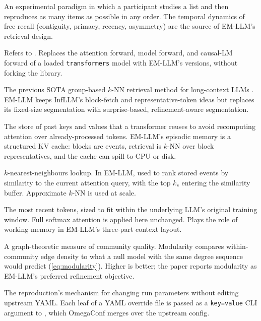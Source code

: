 \begin{description}[style=nextline,itemsep=0.4em]
  \item[Free recall]
  An experimental paradigm in which a participant studies a list and then reproduces as many items as possible in any order. The temporal dynamics of free recall (contiguity, primacy, recency, asymmetry) are the source of EM-LLM's retrieval design.

  \item[Hugging Face patch]
  Refers to . Replaces the attention forward, model forward, and causal-LM forward of a loaded \texttt{transformers} model with EM-LLM's versions, without forking the library.

  \item[InfLLM]
  The previous SOTA group-based $k$-NN retrieval method for long-context LLMs \cite{xiao2024infllm}. EM-LLM keeps InfLLM's block-fetch and representative-token ideas but replaces its fixed-size segmentation with surprise-based, refinement-aware segmentation.

  \item[KV cache]
  The store of past keys and values that a transformer reuses to avoid recomputing attention over already-processed tokens. EM-LLM's episodic memory is a structured KV cache: blocks are events, retrieval is $k$-NN over block representatives, and the cache can spill to CPU or disk.

  \item[$k$-NN retrieval]
  $k$-nearest-neighbours lookup. In EM-LLM, used to rank stored events by similarity to the current attention query, with the top $k_s$ entering the similarity buffer. Approximate $k$-NN is used at scale.

  \item[Local context]
  The most recent tokens, sized to fit within the underlying LLM's original training window. Full softmax attention is applied here unchanged. Plays the role of working memory in EM-LLM's three-part context layout.

  \item[Modularity]
  A graph-theoretic measure of community quality. Modularity compares within-community edge density to what a null model with the same degree sequence would predict (\cref{eq:modularity}). Higher is better; the paper reports modularity as EM-LLM's preferred refinement objective.

  \item[OmegaConf override]
  The reproduction's mechanism for changing run parameters without editing upstream YAML. Each leaf of a YAML override file is passed as a \texttt{key=value} CLI argument to , which OmegaConf merges over the upstream config.


\end{description}
